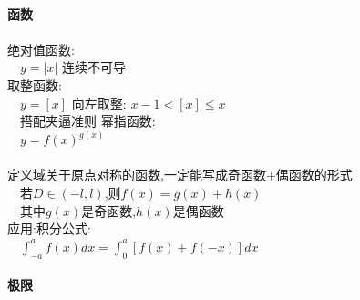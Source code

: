 \documentclass{article}
\begin{document}
\begin{flushleft}
	\fontsize{24pt}{30pt}\selectfont
	
	~\\ \textbf{函数}\\~\\
	
	绝对值函数:\\
	\ \ $y=\vert x\vert$ 连续不可导\\
	取整函数:\\
	\ \ $y=[x]$ 向左取整: $x-1<[x]\leq x$\\
	\ \ 搭配夹逼准则
	幂指函数:\\
	\ \ $y=f(x)^{g(x)}$\\
	~\\
	定义域关于原点对称的函数,一定能写成奇函数+偶函数的形式\\
	\ \ 若$D\in (-l,l)$,则$f(x)=g(x)+h(x)$\\
	\ \ 其中$g(x)$是奇函数,$h(x)$是偶函数\\
	应用:积分公式:\\
	\ \ $\int_{-a}^a f(x)dx=\int_0^a [f(x)+f(-x)]dx$\\
	
	~\\ \textbf{极限}\\~\\
	

\end{flushleft}
\end{document}
